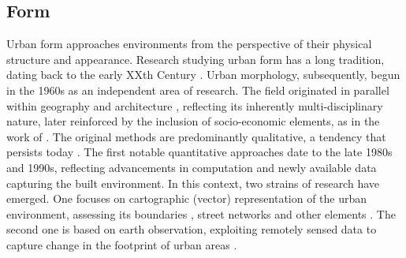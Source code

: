 \subsection{Form}
\label{sec:lit_form}

Urban form approaches environments from the perspective of their physical
structure and appearance. Research studying urban form has a long tradition,
dating back to the early XXth Century \citep{geddes1915cities,
trewartha1934japanese}. Urban morphology, subsequently, begun in the 1960s as an
independent area of research. The field originated in parallel within geography
\citep{conzen1960alnwick} and architecture \citep{muratori1959studi}, reflecting
its inherently multi-disciplinary nature, later reinforced by the inclusion of
socio-economic elements, as in the work of \cite{panerai1997formes}. The
original methods are predominantly qualitative, a tendency that persists today
\citep{dibble2016urban}. The first notable quantitative approaches date to the
late 1980s and 1990s, reflecting advancements in computation and newly available
data capturing the built environment. In this context, two strains of research
have emerged. One focuses on cartographic (vector) representation of the urban
environment, assessing its boundaries \citep{batty1987}, street networks
\citep{hillier1996, porta2006} and other elements \citep{pivo1993taxonomy}. The
second one is based on earth observation, exploiting remotely sensed data to
capture change in the footprint of urban areas \citep{howarth1983landsat}.

